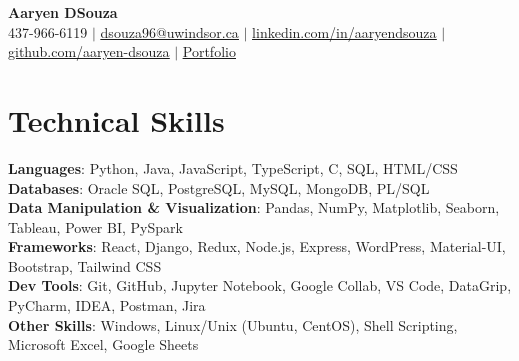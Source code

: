 \documentclass[letterpaper,11pt]{article}
\begin{document}

\begin{center}
	\textbf{\Huge Aaryen DSouza} \\ \vspace{1.5pt}
	\small 437-966-6119 $|$ \href{mailto:dsouza96@uwindsor.ca}{\underline{\phantom{/}dsouza96@uwindsor.ca\phantom{/}}} $|$
	\href{https://www.linkedin.com/in/aaryendsouza}{\underline{\phantom{/}linkedin.com/in/aaryendsouza\phantom{/}}} $|$
	\href{https://github.com/aaryen-dsouza}{\underline{\phantom{/}github.com/aaryen-dsouza\phantom{/}}} $|$
	\href{https://www.aaryen.vercel.app}{\underline{\phantom{/}Portfolio\phantom{/}}}
\end{center}

\section{Technical Skills}
\begin{itemize}[leftmargin=0.15in, label={}]
	\small{\item{
	      \textbf{Languages}{: Python, Java, JavaScript, TypeScript, C, SQL, HTML/CSS} \\
	      \textbf{Databases}{: Oracle SQL, PostgreSQL, MySQL, MongoDB, PL/SQL} \\
	      \textbf{Data Manipulation \& Visualization}{: Pandas, NumPy, Matplotlib, Seaborn, Tableau, Power BI, PySpark} \\
	      \textbf{Frameworks}{: React, Django, Redux, Node.js, Express, WordPress, Material-UI, Bootstrap, Tailwind CSS} \\
	      \textbf{Dev Tools}{: Git, GitHub, Jupyter Notebook, Google Collab, VS Code, DataGrip, PyCharm, IDEA, Postman, Jira} \\
	      \textbf{Other Skills}{: Windows, Linux/Unix (Ubuntu, CentOS), Shell Scripting, Microsoft Excel, Google Sheets}
	      }}
\end{itemize}


\end{document}
